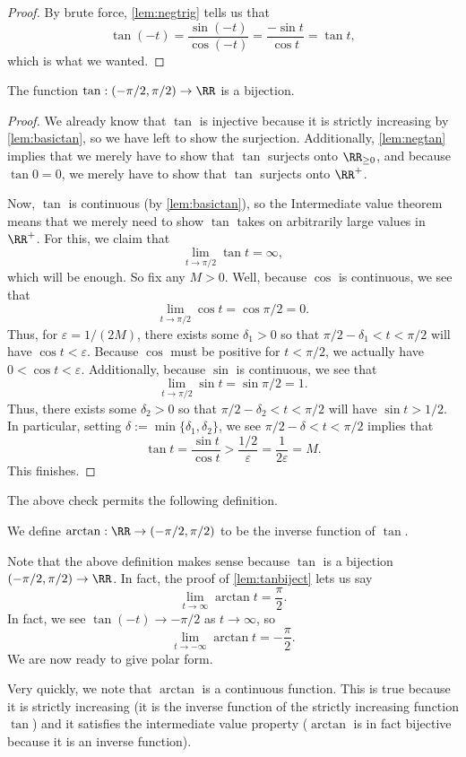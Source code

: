 \begin{proof}
	By brute force, \autoref{lem:negtrig} tells us that
	\[\tan(-t)=\frac{\sin(-t)}{\cos(-t)}=\frac{-\sin t}{\cos t}=\tan t,\]
	which is what we wanted.
\end{proof}
\begin{lemma} \label{lem:tanbiject}
	The function $\tan:(-\pi/2,\pi/2)\to\RR$ is a bijection.
\end{lemma}
\begin{proof}
	We already know that $\tan$ is injective because it is strictly increasing by \autoref{lem:basictan}, so we have left to show the surjection. Additionally, \autoref{lem:negtan} implies that we merely have to show that $\tan$ surjects onto $\RR_{\ge0}$, and because $\tan0=0$, we merely have to show that $\tan$ surjects onto $\RR^+$.

	Now, $\tan$ is continuous (by \autoref{lem:basictan}), so the Intermediate value theorem means that we merely need to show $\tan$ takes on arbitrarily large values in $\RR^+$. For this, we claim that
	\[\lim_{t\to\pi/2}\tan t=\infty,\]
	which will be enough. So fix any $M>0$. Well, because $\cos$ is continuous, we see that
	\[\lim_{t\to\pi/2}\cos t=\cos\pi/2=0.\]
	Thus, for $\varepsilon=1/(2M)$, there exists some $\delta_1>0$ so that $\pi/2-\delta_1<t<\pi/2$ will have $\cos t<\varepsilon$. Because $\cos$ must be positive for $t<\pi/2$, we actually have $0<\cos t<\varepsilon$. Additionally, because $\sin$ is continuous, we see that
	\[\lim_{t\to\pi/2}\sin t=\sin\pi/2=1.\]
	Thus, there exists some $\delta_2>0$ so that $\pi/2-\delta_2<t<\pi/2$ will have $\sin t>1/2$. In particular, setting $\delta:=\min\{\delta_1,\delta_2\}$, we see $\pi/2-\delta<t<\pi/2$ implies that
	\[\tan t=\frac{\sin t}{\cos t}>\frac{1/2}{\varepsilon}=\frac1{2\varepsilon}=M.\]
	This finishes.
\end{proof}
The above check permits the following definition.
\begin{definition}[Arctangent]
	We define $\arctan:\RR\to(-\pi/2,\pi/2)$ to be the inverse function of $\tan$.
\end{definition}
Note that the above definition makes sense because $\tan$ is a bijection $(-\pi/2,\pi/2)\to\RR$. In fact, the proof of \autoref{lem:tanbiject} lets us say
\[\lim_{t\to\infty}\arctan t=\frac\pi2.\]
In fact, we see $\tan(-t)\to-\pi/2$ as $t\to\infty$, so
\[\lim_{t\to-\infty}\arctan t=-\frac\pi2.\]
We are now ready to give polar form.
\begin{remark}
	Very quickly, we note that $\arctan$ is a continuous function. This is true because it is strictly increasing (it is the inverse function of the strictly increasing function $\tan$) and it satisfies the intermediate value property ($\arctan$ is in fact bijective because it is an inverse function).
\end{remark}
